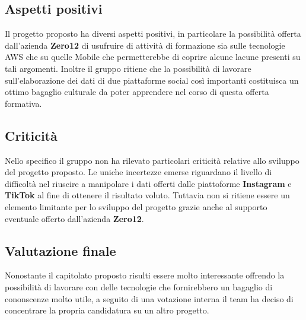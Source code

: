 		\subsection{Aspetti positivi}
		Il progetto proposto ha diversi aspetti positivi, in particolare la possibilità offerta dall'azienda \textbf{Zero12} di usufruire di attività di formazione sia sulle tecnologie AWS che su quelle Mobile che permetterebbe di coprire alcune lacune presenti su tali argomenti. Inoltre il gruppo ritiene che la possibilità di lavorare sull'elaborazione dei dati di due piattaforme social così importanti costituisca un ottimo bagaglio culturale da poter apprendere nel corso di questa offerta formativa. 
		\subsection{Criticità}
		Nello specifico il gruppo non ha rilevato particolari criticità relative allo sviluppo del progetto proposto. Le uniche incertezze emerse riguardano il livello di difficoltà nel riuscire a manipolare i dati offerti dalle piattoforme \textbf{Instagram} e \textbf{TikTok} al fine di ottenere il risultato voluto. Tuttavia non si ritiene essere un elemento limitante per lo sviluppo del progetto grazie anche al supporto eventuale offerto dall'azienda \textbf{Zero12}.
		\subsection{Valutazione finale}
		Nonostante il capitolato proposto risulti essere molto interessante offrendo la possibilità di lavorare con delle tecnologie che fornirebbero un bagaglio di cononscenze molto utile, a seguito di una votazione interna il team ha deciso di concentrare la propria candidatura su un altro progetto. 